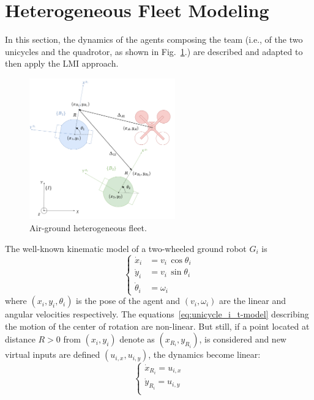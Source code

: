 \documentclass{ifacconf}
\begin{document}
\section{Heterogeneous Fleet Modeling}
\label{sec:heterogeneous_fleet_modeling}
In this section, the dynamics of the agents composing the team
(i.e., of the two unicycles and the quadrotor, as shown in Fig.~\ref{fig:airground-fleet}.)
are described and adapted to then apply the LMI approach.
\begin{figure}
    \centering
    \includegraphics[height=6.1cm]{images/heterogenous_fleet_PNG300_2.png}
    \caption{Air-ground heterogeneous fleet.}
    \label{fig:airground-fleet}
\end{figure}
The well-known kinematic model of a two-wheeled ground robot $G_i$ is
\begin{equation}
    \begin{cases}
        \dot{x}_i &= v_i \, \cos\theta_i \\
        \dot{y}_i &= v_i \, \sin\theta_i \\
        \dot{\theta}_i &= \omega_i
    \end{cases}
    \label{eq:unicycle_i_t-model}
\end{equation}
where $(x_i, y_i, \theta_i)$ is the pose of the agent 
and $(v_i, \omega_i)$ are the linear and
angular velocities respectively.
The equations~\eqref{eq:unicycle_i_t-model} describing the motion of the center of rotation are non-linear.
But still, if a point located at distance $R > 0$ from 
$(x_i, y_i)$ denote as $({x}_{R_i}, {y}_{R_i})$, is 
considered and new virtual inputs are defined $(u_{i,x},u_{i,y})$, 
the dynamics become linear:
\begin{equation}
    \begin{cases}
        \dot{x}_{R_i} = u_{i,x} \\
        \dot{y}_{R_i} = u_{i,y} \\
    \end{cases}
\end{equation}
\end{document}
